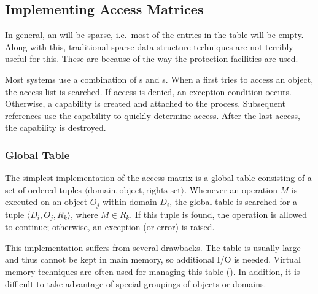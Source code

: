 \subsection{Implementing Access Matrices}\label{subsec:Implement_Access_Matrices}
In general, an  will be sparse, i.e.\ most of the entries in the table will be empty.
Along with this, traditional sparse data structure techniques are not terribly useful for this.
These are because of the way the protection facilities are used.

Most systems use a combination of s and s.
When a  first tries to access an object, the access list is searched.
If access is denied, an exception condition occurs.
Otherwise, a capability is created and attached to the process.
Subsequent references use the capability to quickly determine access.
After the last access, the capability is destroyed.

\subsubsection{Global Table}\label{subsubsec:Global_Access_Matrix}
The simplest implementation of the access matrix is a global table consisting of a set of ordered tuples $\langle \text{domain}, \text{object}, \text{rights-set} \rangle$.
Whenever an operation $M$ is executed on an object $O_{j}$ within domain $D_{i}$, the global table is searched for a tuple $\langle D_{i}, O_{j}, R_{k} \rangle$, where $M \in R_{k}$.
If this tuple is found, the operation is allowed to continue; otherwise, an exception (or error) is raised.

This implementation suffers from several drawbacks.
The table is usually large and thus cannot be kept in main memory, so additional I/O is needed.
Virtual memory techniques are often used for managing this table ().
In addition, it is difficult to take advantage of special groupings of objects or domains.


